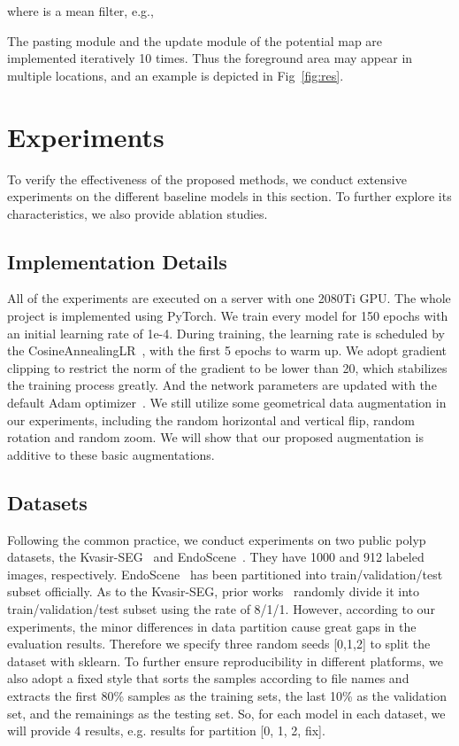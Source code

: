 \documentclass{article}
\begin{document}
\noindent
where  is a mean filter, e.g.,




The pasting module and the update module of the potential map are implemented iteratively 10 times. Thus the foreground area may appear in multiple locations, and an example is depicted in Fig~\ref{fig:res}. 





\vspace{-0.2cm}
\section{Experiments}
\vspace{-0.2cm}
To verify the effectiveness of the proposed methods, we conduct extensive experiments on the different baseline models in this section. To further explore its characteristics, we also provide ablation studies.

\subsection{Implementation Details}
All of the experiments are executed on a server with one 2080Ti GPU. The whole project is implemented using PyTorch. We train every model for 150 epochs with an initial learning rate of 1e-4. During training, the learning rate is scheduled by the CosineAnnealingLR~\cite{coslr}, with the first 5 epochs to warm up. We adopt gradient clipping to restrict the norm of the gradient to be lower than 20, which stabilizes the training process greatly. And the network parameters are updated with the default Adam optimizer~\cite{adam}. We still utilize some geometrical data augmentation in our experiments, including the random horizontal and vertical flip, random rotation and random zoom. We will show that our proposed augmentation is additive to these basic augmentations.

\vspace{-0.3cm}

\subsection{Datasets}

Following the common practice, we conduct experiments on two public polyp datasets, the Kvasir-SEG~\cite{kvasir} and EndoScene~\cite{endoscene}. They have 1000 and 912 labeled images, respectively. EndoScene~\cite{endoscene} has been partitioned into train/validation/test subset officially. As to the Kvasir-SEG, prior works~\cite{ssformer,FCBFormer} randomly divide it into train/validation/test subset using the rate of 8/1/1. However, according to our experiments, the minor differences in data partition cause great gaps in the evaluation results. Therefore we specify three random seeds [0,1,2] to split the dataset with sklearn. To further ensure reproducibility in different platforms, we also adopt a fixed style that sorts the samples according to file names and extracts the first 80\% samples as the training sets, the last 10\% as the validation set, and the remainings as the testing set. So, for each model in each dataset, we will provide 4 results, e.g. results for partition [0, 1, 2, fix].
\end{document}
